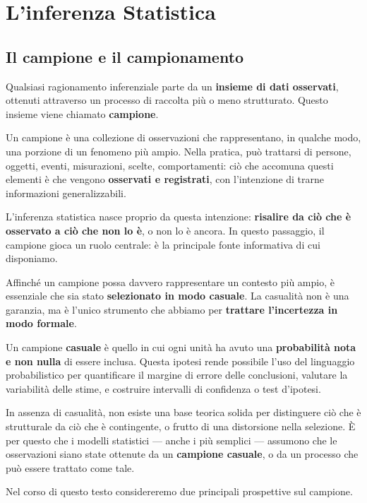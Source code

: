 \documentclass[
  11pt,
]{book}
\theoremstyle{mytheoremstyle}
\theoremstyle{mydefstyle}
\begin{document}
\section{L'inferenza Statistica}\label{linferenza-statistica}

\subsection{Il campione e il campionamento}\label{il-campione-e-il-campionamento}

Qualsiasi ragionamento inferenziale parte da un \textbf{insieme di dati osservati}, ottenuti attraverso un processo di raccolta più o meno strutturato. Questo insieme viene chiamato \textbf{campione}.

Un campione è una collezione di osservazioni che rappresentano, in qualche modo, una porzione di un fenomeno più ampio. Nella pratica, può trattarsi di persone, oggetti, eventi, misurazioni, scelte, comportamenti: ciò che accomuna questi elementi è che vengono \textbf{osservati e registrati}, con l'intenzione di trarne informazioni generalizzabili.

L'inferenza statistica nasce proprio da questa intenzione: \textbf{risalire da ciò che è osservato a ciò che non lo è}, o non lo è ancora. In questo passaggio, il campione gioca un ruolo centrale: è la principale fonte informativa di cui disponiamo.

Affinché un campione possa davvero rappresentare un contesto più ampio, è essenziale che sia stato \textbf{selezionato in modo casuale}. La casualità non è una garanzia, ma è l'unico strumento che abbiamo per \textbf{trattare l'incertezza in modo formale}.

Un campione \textbf{casuale} è quello in cui ogni unità ha avuto una \textbf{probabilità nota e non nulla} di essere inclusa. Questa ipotesi rende possibile l'uso del linguaggio probabilistico per quantificare il margine di errore delle conclusioni, valutare la variabilità delle stime, e costruire intervalli di confidenza o test d'ipotesi.

In assenza di casualità, non esiste una base teorica solida per distinguere ciò che è strutturale da ciò che è contingente, o frutto di una distorsione nella selezione. È per questo che i modelli statistici --- anche i più semplici --- assumono che le osservazioni siano state ottenute da un \textbf{campione casuale}, o da un processo che può essere trattato come tale.

Nel corso di questo testo considereremo due principali prospettive sul campione.
\end{document}
